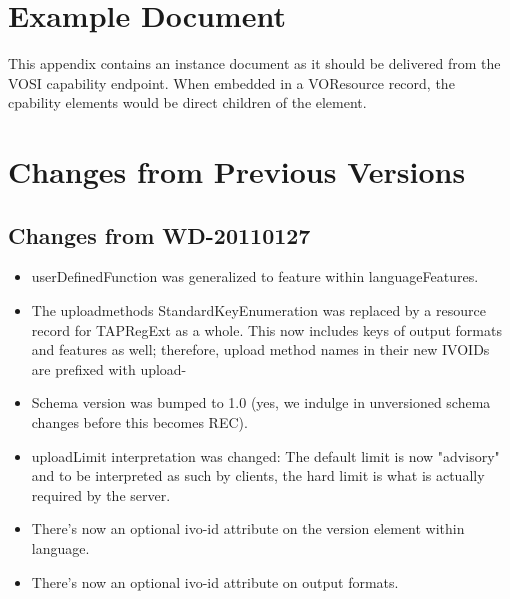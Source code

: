 \documentclass{ivoa}
\begin{document}
\label{app:fullschema}



\section{Example Document}

\label{app:example}

This appendix contains an instance document as it should be 
delivered from the VOSI capability endpoint. When embedded in a
VOResource record, the cpability elements would be direct children of
the  element.




\section{Changes from Previous Versions}

\label{changes}


\subsection{Changes from WD-20110127}

\label{changes-20110127}

\begin{itemize}

\item userDefinedFunction was generalized to feature within languageFeatures.{}

\item The uploadmethods StandardKeyEnumeration was replaced by a
resource record for TAPRegExt as a whole.  This now includes keys of output
formats and features as well; therefore, upload method names in their new
IVOIDs are prefixed with upload-{}

\item Schema version was bumped to 1.0 (yes, we indulge in unversioned
schema changes before this becomes REC).{}

\item uploadLimit interpretation was changed: The default limit is now
"advisory" and to be interpreted as such by clients, the hard limit
is what is actually required by the server.{}

\item There's now an optional ivo-id attribute on the version element
within language.{}

\item There's now an optional ivo-id attribute on output formats.{}

\end{itemize}
\end{document}
